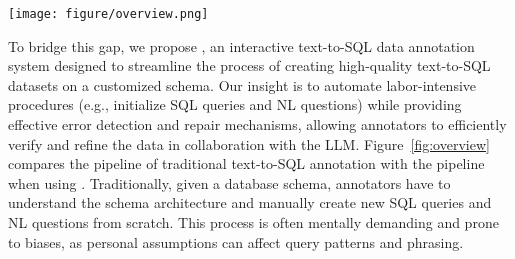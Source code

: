 

\begin{figure*}[ht]
  \centering
  \texttt{[image: figure/overview.png]}
  \caption{Illustration of traditional text-to-SQL annotation v.s. using {\tool}. }
  \label{fig:overview}
\end{figure*}


To bridge this gap, we propose {\tool}, an interactive text-to-SQL data annotation system designed to streamline the process of creating high-quality text-to-SQL datasets on a customized schema. 
Our insight is to automate labor-intensive procedures (e.g., initialize SQL queries and NL questions) while providing effective error detection and repair mechanisms, allowing annotators to efficiently verify and refine the data in collaboration with the LLM.
Figure~\ref{fig:overview} compares the pipeline of traditional text-to-SQL annotation with the pipeline when using {\tool}. 
Traditionally, given a database schema, annotators have to understand the schema architecture and manually create new SQL queries and NL questions from scratch. This process is often mentally demanding and prone to biases, as personal assumptions can affect query patterns and phrasing.

